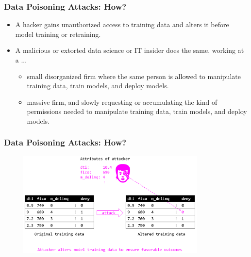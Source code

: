 \documentclass[11pt,
               aspectratio=169,
               hyperref={colorlinks}
               ]{beamer}
\begin{document}
			\begin{frame}
		
				\frametitle{Data Poisoning Attacks: \textbf{How?}}
				
				\begin{itemize}
					\item A hacker gains unauthorized access to training data and alters it before model training or retraining.
					\item A malicious or extorted data science or IT insider does the same, working at a ...
					\begin{itemize}
						\item small disorganized firm where the same person is allowed to manipulate training data, train models, and deploy models.
						\item massive firm, and slowly requesting or accumulating the kind of permissions needed to manipulate training data, train models, and deploy models.
					\end{itemize}
				\end{itemize}
			
			\end{frame}
			
			\begin{frame}
		
				\frametitle{Data Poisoning Attacks: \textbf{How?}}		
			
				\begin{figure}[htb]
					\begin{center}
						\includegraphics[height=150pt]{img/poison.png}
					\end{center}
				\end{figure}	
		
			\end{frame}
		
\end{document}
